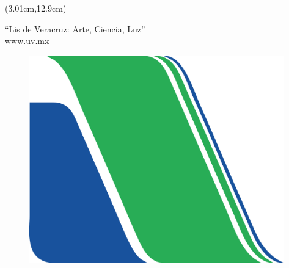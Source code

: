 
\thispagestyle{empty} %

\begin{textblock*}{10cm}(3.01cm,12.9cm)
	\begin{flushleft}
    {\GilliusCinco “Lis de Veracruz: Arte, Ciencia, Luz”}\\[10pt]
		{\GilliusSeis www.uv.mx}
	\end{flushleft}
\end{textblock*}

\begin{figure}[!b]
	\includegraphics[height=9cm,left]{Figuras/0-UV/Inferior.png}
\end{figure}

% 

\restoregeometry %

